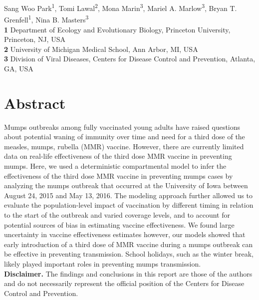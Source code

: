 \documentclass[12pt]{article}
\date{\today}
\begin{document}
\begin{flushleft}{
	\Large
	\textbf{}
}
\newline
Sang Woo Park\textsuperscript{1},
Tomi Lawal\textsuperscript{2},
Mona Marin\textsuperscript{3},
Mariel A. Marlow\textsuperscript{3},
Bryan T. Grenfell\textsuperscript{1},
Nina B. Masters\textsuperscript{3}
\\ 
\bigskip
\textbf{1} Department of Ecology and Evolutionary Biology, Princeton University, Princeton, NJ, USA
\\
\textbf{2} University of Michigan Medical School, Ann Arbor, MI, USA
\\
\textbf{3} Division of Viral Diseases, Centers for Disease Control and Prevention, Atlanta, GA, USA
\end{flushleft} 

\section*{Abstract}

Mumps outbreaks among fully vaccinated young adults have raised questions about potential waning of immunity over time and need for a third dose of the measles, mumps, rubella (MMR) vaccine. 
However, there are currently limited data on real-life effectiveness of the third dose MMR vaccine in preventing mumps.
Here, we used a deterministic compartmental model to infer the effectiveness of the third dose MMR vaccine in preventing mumps cases by analyzing the mumps outbreak that occurred at the University of Iowa between August 24, 2015 and May 13, 2016. 
The modeling approach further allowed us to evaluate the population-level impact of vaccination by different timing in relation to the start of the outbreak and varied coverage levels, and to account for potential sources of bias in estimating vaccine effectiveness.
We found large uncertainty in vaccine effectiveness estimates however, our models showed that early introduction of a third dose of MMR vaccine during a mumps outbreak can be effective in preventing transmission.  
School holidays, such as the winter break, likely played important roles in preventing mumps transmission.  
\\
\newline
\textbf{Disclaimer.} The findings and conclusions in this report are those of the authors and do not necessarily represent the official position of the Centers for Disease Control and Prevention.
\end{document}
